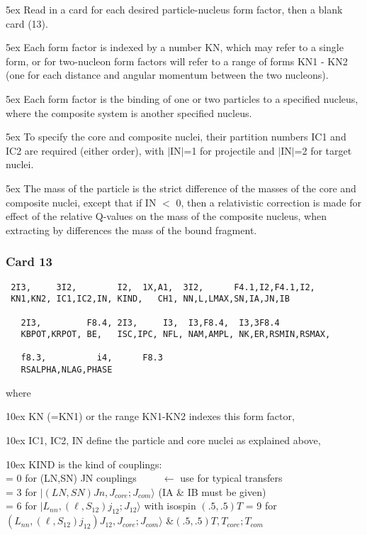 \documentclass[11pt]{article}
\begin{document}
\hangindent 5ex
Read in a card for each desired particle-nucleus form factor,
then a blank card (13).

\hangindent 5ex
Each form factor is indexed by a number KN, which may refer to
a single form, or for two-nucleon form factors will refer to a range
of forms KN1 - KN2
(one for each distance and angular momentum between the two nucleons).

\hangindent 5ex
Each form factor is the binding of one or two particles to a
specified nucleus, where the composite system is another specified
nucleus.

\hangindent 5ex
To specify the core and composite nuclei, their partition numbers
IC1 and IC2 are required (either order), with $|$IN$|$=1 for projectile
and $|$IN$|$=2 for target nuclei.

\hangindent 5ex
The mass of the particle is the strict difference of the masses of
the core and composite nuclei, except that if IN $<$ 0, then a
relativistic correction is made for effect of the relative Q-values
on the mass of the composite nucleus, when extracting by differences
the mass of the bound fragment.

\subsubsection*{Card 13}
\begin{verbatim}
 2I3,     3I2,        I2,  1X,A1,  3I2,      F4.1,I2,F4.1,I2,
 KN1,KN2, IC1,IC2,IN, KIND,   CH1, NN,L,LMAX,SN,IA,JN,IB

   2I3,         F8.4, 2I3,     I3,  I3,F8.4,  I3,3F8.4
   KBPOT,KRPOT, BE,   ISC,IPC, NFL, NAM,AMPL, NK,ER,RSMIN,RSMAX,
   
   f8.3,          i4,      F8.3
   RSALPHA,NLAG,PHASE
\end{verbatim}
where

\hangindent 10ex
KN (=KN1) or the range KN1-KN2 indexes this form factor,

\hangindent 10ex
IC1, IC2, IN define the particle and core nuclei as explained above,

\hangindent 10ex
KIND is the kind of couplings:
\\
= 0 for (LN,SN) JN couplings   ~ ~ ~$\leftarrow$ use for typical transfers\\
= 3 for $|(LN,SN)Jn, J_{core}; J_{com}\rangle$    (IA \& IB must be given)\\
= 6 for $|L_{nn}, (\ell,S_{12})j_{12}; J_{12}\rangle$  with isospin $(.5,.5) T$
= 9 for $(L_{nn},(\ell,S_{12})j_{12})J_{12}, J_{core}; J_{com}\rangle$ \&$(.5,.5)T,T_{core};T_{com}$
\end{document}
